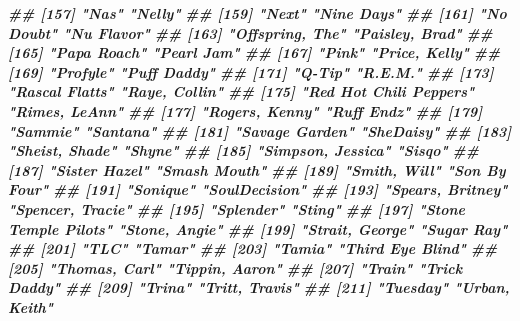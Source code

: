 \documentclass[
  11pt]{report}
\newenvironment{Shaded}{\begin{snugshade}}{\end{snugshade}}
\newcommand{\DocumentationTok}[1]{\textcolor[rgb]{0.56,0.35,0.01}{\textbf{\textit{#1}}}}
\renewenvironment{Shaded}{
    \begin{mdframed}[%
      roundcorner=2pt,%
      innerleftmargin=5pt,%
      innerrightmargin=5pt,%
      topline=true,%
      leftline=true,%
      rightline=true,%
      bottomline=true,%
      linewidth=0.5pt,%
      linecolor=black!20,%
      backgroundcolor=black!2,%
      skipabove=2ex,%
      skipbelow=2.5ex%
    ]%
  }
  {
    \end{mdframed}
  }
\begin{document}
\begin{itemize}
\begin{Shaded}
\begin{Highlighting}[]
\DocumentationTok{\#\# [157] "Nas"                            "Nelly"                         }
\DocumentationTok{\#\# [159] "Next"                           "Nine Days"                     }
\DocumentationTok{\#\# [161] "No Doubt"                       "Nu Flavor"                     }
\DocumentationTok{\#\# [163] "Offspring, The"                 "Paisley, Brad"                 }
\DocumentationTok{\#\# [165] "Papa Roach"                     "Pearl Jam"                     }
\DocumentationTok{\#\# [167] "Pink"                           "Price, Kelly"                  }
\DocumentationTok{\#\# [169] "Profyle"                        "Puff Daddy"                    }
\DocumentationTok{\#\# [171] "Q{-}Tip"                          "R.E.M."                        }
\DocumentationTok{\#\# [173] "Rascal Flatts"                  "Raye, Collin"                  }
\DocumentationTok{\#\# [175] "Red Hot Chili Peppers"          "Rimes, LeAnn"                  }
\DocumentationTok{\#\# [177] "Rogers, Kenny"                  "Ruff Endz"                     }
\DocumentationTok{\#\# [179] "Sammie"                         "Santana"                       }
\DocumentationTok{\#\# [181] "Savage Garden"                  "SheDaisy"                      }
\DocumentationTok{\#\# [183] "Sheist, Shade"                  "Shyne"                         }
\DocumentationTok{\#\# [185] "Simpson, Jessica"               "Sisqo"                         }
\DocumentationTok{\#\# [187] "Sister Hazel"                   "Smash Mouth"                   }
\DocumentationTok{\#\# [189] "Smith, Will"                    "Son By Four"                   }
\DocumentationTok{\#\# [191] "Sonique"                        "SoulDecision"                  }
\DocumentationTok{\#\# [193] "Spears, Britney"                "Spencer, Tracie"               }
\DocumentationTok{\#\# [195] "Splender"                       "Sting"                         }
\DocumentationTok{\#\# [197] "Stone Temple Pilots"            "Stone, Angie"                  }
\DocumentationTok{\#\# [199] "Strait, George"                 "Sugar Ray"                     }
\DocumentationTok{\#\# [201] "TLC"                            "Tamar"                         }
\DocumentationTok{\#\# [203] "Tamia"                          "Third Eye Blind"               }
\DocumentationTok{\#\# [205] "Thomas, Carl"                   "Tippin, Aaron"                 }
\DocumentationTok{\#\# [207] "Train"                          "Trick Daddy"                   }
\DocumentationTok{\#\# [209] "Trina"                          "Tritt, Travis"                 }
\DocumentationTok{\#\# [211] "Tuesday"                        "Urban, Keith"                  }

\end{Highlighting}
\end{Shaded}
\end{itemize}
\end{document}
